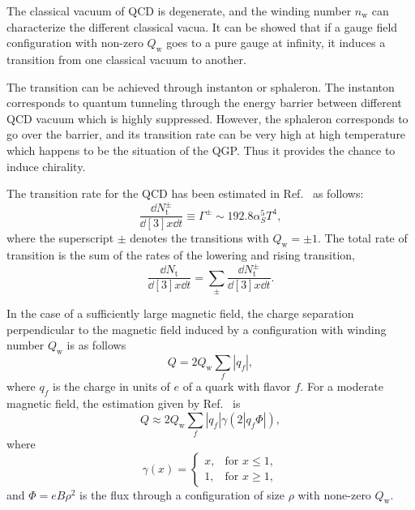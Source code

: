 \documentclass[a4paper,10pt,twoside]{cpc-hepnp}
\begin{document}
\begin{CJK*}{GBK}{song}
\begin{multicols}{2}
The classical vacuum of QCD is degenerate, and the winding number $n_\text{w}$ can characterize the different classical vacua. It can be showed that if a gauge field configuration with non-zero $Q_\text{w}$ goes to a pure gauge at infinity, it induces a transition from one classical vacuum to another.

The transition can be achieved through instanton\cite{Diakonov:2002fq,Schafer:1995pz} or sphaleron\cite{Arnold:1987zg,Fukugita:1990gb}. The instanton corresponds to quantum tunneling through the energy barrier between different QCD vacuum which is highly suppressed. However, the sphaleron corresponds to go over the barrier, and its transition rate can be very high at high temperature which happens to be the situation of the QGP. Thus it provides the chance to induce chirality.

The transition rate for the QCD has been estimated in Ref.~\cite{Kharzeev:2007jp} as follows:
\begin{equation} \label{tranRate}
\frac{\dd{N^\pm_\text{t}}}{\dd[3]{x}\dd{t}} \equiv \Gamma^\pm \sim 192.8 \alpha^5_S T^4,
\end{equation}
where the superscript $\pm$ denotes the transitions with $Q_\text{w} = \pm 1$. The total rate of transition is the sum of the rates of the lowering and rising transition,
\begin{equation}
\frac{\dd{N_\text{t}}}{\dd[3]{x}\dd{t}} = \sum_\pm \frac{\dd{N_\text{t}^\pm}}{\dd[3]{x}\dd{t}}.
\end{equation}

In the case of a sufficiently large magnetic field, the charge separation perpendicular to the magnetic field induced by a configuration with winding number $Q_\text{w}$ is as follows
\begin{equation}
Q = 2 Q_\text{w} \sum_f |q_f|,
\end{equation}
where $q_f$ is the charge in units of $e$ of a quark with flavor $f$. For a moderate magnetic field, the estimation given by Ref.~\cite{Kharzeev:2007jp} is
\begin{equation}
Q \approx 2 Q_\text{w} \sum_f |q_f| \gamma(2|q_f \Phi|),
\end{equation}
where
\begin{equation}
\gamma(x) = \begin{cases}
x, & \text{for } x \leq 1, \\
1, & \text{for } x \geq 1,
\end{cases}
\end{equation}
and $\Phi = eB\rho^2$ is the flux through a configuration of size $\rho$ with none-zero $Q_\text{w}$.


\end{multicols}
\end{CJK*}
\end{document}
